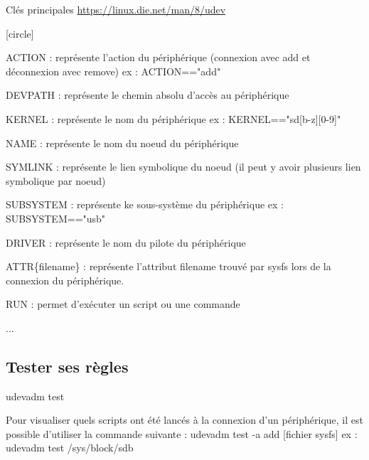 \documentclass{beamer}
\begin{document}
\begin{frame}
\begin{block}{Clés principales \url{https://linux.die.net/man/8/udev}} 
	
	\begin{itemize}
		
		[circle]
		\footnotesize{
		\item ACTION : représente l'action du périphérique (connexion avec add et déconnexion avec remove) ex : ACTION=="add"
		\item DEVPATH : représente le chemin absolu d'accès au périphérique
		\item KERNEL : représente le nom du périphérique ex : KERNEL=="sd[b-z][0-9]"
		\item NAME : représente le nom du noeud du périphérique
		\item SYMLINK : représente le lien symbolique du noeud (il peut y avoir plusieurs lien symbolique par noeud)
		\item SUBSYSTEM : représente ke sous-système du périphérique ex : SUBSYSTEM=="usb"
		\item DRIVER : représente le nom du pilote du périphérique
		\item ATTR\{filename\} : représente l'attribut filename trouvé par sysfs lors de la connexion du périphérique.
		\item RUN : permet d'exécuter un script ou une commande
		\item ...
		
	}
	\end{itemize}
\end{block}
\end{frame}

\subsection{Tester ses règles}
\begin{frame}
\begin{exampleblock}{udevadm test} 
		
		Pour visualiser quels scripts ont été lancés à la connexion d'un périphérique, il est possible d'utiliser la commande suivante : 
		udevadm test -a add [fichier sysfs] \newline ex : udevadm test /sys/block/sdb
\end{exampleblock}
\end{frame}
\end{document}

